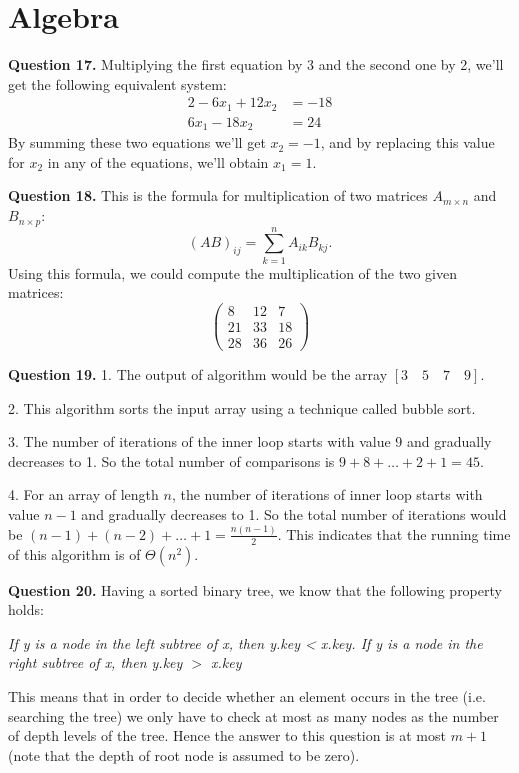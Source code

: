 \documentclass[10pt,a4paper]{article}
\newcommand{\question}[1]{\bigskip \noindent \textbf{Question #1.}}
\begin{document}
\section{Algebra}

\question{17} Multiplying the first equation by 3 and the second one by 2, we'll get the following equivalent system:
\begin{alignat*}{2}
 -6  x_1  + 12  x_2 & = -18 \\
 6  x_1  - 18  x_2 & = 24
\end{alignat*}
By summing these two equations we'll get $x_2 = -1$, and by replacing this value for $x_2$ in any of the equations, we'll obtain $x_1 = 1$.

\question{18} This is the formula for multiplication of two matrices $A_{m \times n}$ and $B_{n \times p}$:
\begin{equation*}
    (AB)_{ij} = \sum_{k=1}^n A_{ik}B_{kj}. 
\end{equation*}
Using this formula, we could compute the multiplication of the two given matrices:
\begin{equation*}
\begin{pmatrix}
8 & 12 & 7 \\
21 & 33 & 18 \\
28 & 36 & 26
\end{pmatrix}
\end{equation*}

\question{19} 1. The output of algorithm would be the array $ [3 \quad 5 \quad 7 \quad 9] $.

2. This algorithm sorts the input array using a technique called bubble sort.

3. The number of iterations of the inner loop starts with value 9 and gradually decreases to 1. So the total number of comparisons is $ 9 + 8 + \ldots + 2 + 1 = 45$.

4. For an array of length $n$, the number of iterations of inner loop starts with value $n-1$ and gradually decreases to 1. So the total number of iterations would be $(n-1) + (n-2) + \ldots + 1 = \frac{n(n-1)}{2}$. This indicates that the running time of this algorithm is of $\Theta(n^2)$.

\question{20} Having a sorted binary tree, we know that the following property holds:

\emph{If y is a node in the left subtree of x, then y.key < x.key. If y is a node in the right subtree of x, then y.key $>$ x.key}

This means that in order to 	decide whether an element occurs in the tree (i.e. searching the tree) we only have to check at most as many nodes as the number of depth levels of the tree. Hence the answer to this question is at most $m+1$ (note that the depth of root node is assumed to be zero). 
\end{document}
